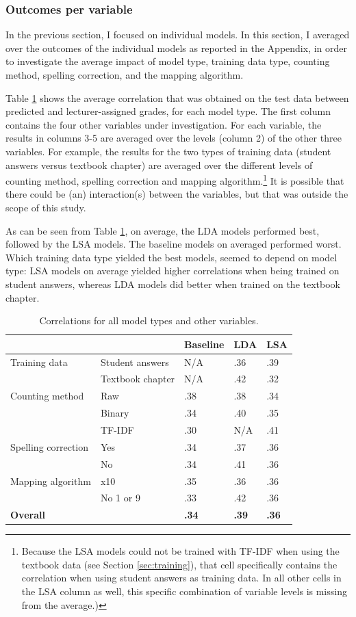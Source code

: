 \documentclass[a4paper,10pt,twoside]{article}
\begin{document}
\subsubsection{Outcomes per variable}
In the previous section, I focused on individual models. In this section, I averaged over the outcomes of the individual models as reported in the Appendix, in order to investigate the average impact of model type, training data type, counting method, spelling correction, and the mapping algorithm. 

Table \ref{table1} shows the average correlation that was obtained on the test data between predicted and lecturer-assigned grades, for each model type. The first column contains the four other variables under investigation. For each variable, the results in columns 3-5 are averaged over the levels (column 2) of the other three variables. For example, the results for the two types of training data (student answers versus textbook chapter) are averaged over the different levels of counting method, spelling correction and mapping algorithm.\footnote{Because the LSA models could not be trained with TF-IDF when using the textbook data (see Section \ref{sec:training}), that cell specifically contains the correlation when using student answers as training data. In all other cells in the LSA column as well, this specific combination of variable levels is missing from the average.) } It is possible that there could be (an) interaction(s) between the variables, but that was outside the scope of this study.

As can be seen from Table \ref{table1}, on average, the LDA models performed best, followed by the LSA models. The baseline models on averaged performed worst. Which training data type yielded the best models, seemed to depend on model type: LSA models on average yielded higher correlations when being trained on student answers, whereas LDA models did better when trained on the textbook chapter.

\begin{table}[h]
	\caption{Correlations for all model types and other variables.}
	\label{table1}
	\centering
	\begin{tabular}{lllll}
		\hline  &  & \textbf{Baseline} & \textbf{LDA} & \textbf{LSA} \\ 
		\hline  Training data & Student answers & N/A & .36 & .39 \\ 
		& Textbook chapter & N/A & .42 & .32 \\ 
		\hline  Counting method & Raw & .38 & .38 & .34 \\ 
		& Binary & .34 & .40 & .35 \\ 
		& TF-IDF & .30 & N/A & .41 \\ 
		\hline  Spelling correction & Yes & .34 & .37 & .36 \\ 
		& No & .34 & .41 & .36 \\ 
		\hline  Mapping algorithm & x10 & .35 & .36 & .36 \\ 
		& No 1 or 9 & .33 & .42 & .36 \\ 
		\hline  \textbf{Overall} &  & \textbf{.34} & \textbf{.39} & \textbf{.36} \\ 
		\hline 
	\end{tabular} 
\end{table}
\end{document}
